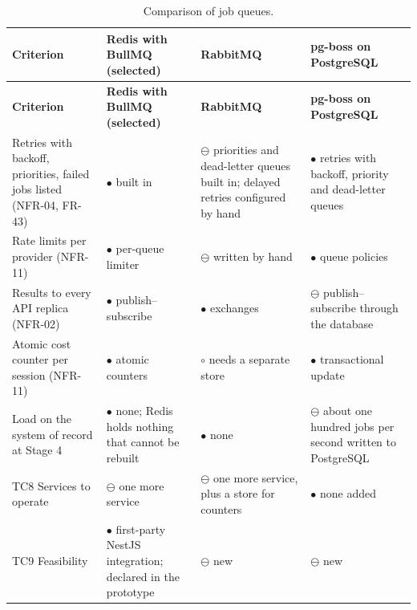 {\small
\begin{longtable}{|>{\raggedright\arraybackslash}p{}|>{\raggedright\arraybackslash}p{}|>{\raggedright\arraybackslash}p{}|>{\raggedright\arraybackslash}p{}|}
\caption{Comparison of job queues.} \\
\hline
\textbf{Criterion} & \textbf{Redis with BullMQ (selected)} & \textbf{RabbitMQ\cite{r184}} & \textbf{pg-boss on PostgreSQL\cite{r185}} \\ \hline
\endfirsthead
\hline
\textbf{Criterion} & \textbf{Redis with BullMQ (selected)} & \textbf{RabbitMQ\cite{r184}} & \textbf{pg-boss on PostgreSQL\cite{r185}} \\ \hline
\endhead
Retries with backoff, priorities, failed jobs listed (NFR-04, FR-43) & $\bullet$ built in\cite{r154} & $\ominus$ priorities and dead-letter queues built in; delayed retries configured by hand & $\bullet$ retries with backoff, priority and dead-letter queues \\ \hline
Rate limits per provider (NFR-11) & $\bullet$ per-queue limiter & $\ominus$ written by hand & $\bullet$ queue policies \\ \hline
Results to every API replica (NFR-02) & $\bullet$ publish--subscribe & $\bullet$ exchanges & $\ominus$ publish--subscribe through the database \\ \hline
Atomic cost counter per session (NFR-11) & $\bullet$ atomic counters & $\circ$ needs a separate store & $\bullet$ transactional update \\ \hline
Load on the system of record at Stage 4 & $\bullet$ none; Redis holds nothing that cannot be rebuilt & $\bullet$ none & $\ominus$ about one hundred jobs per second written to PostgreSQL \\ \hline
TC8 Services to operate & $\ominus$ one more service & $\ominus$ one more service, plus a store for counters & $\bullet$ none added \\ \hline
TC9 Feasibility & $\bullet$ first-party NestJS integration\cite{r149}; declared in the prototype & $\ominus$ new & $\ominus$ new \\ \hline
\end{longtable}
}

